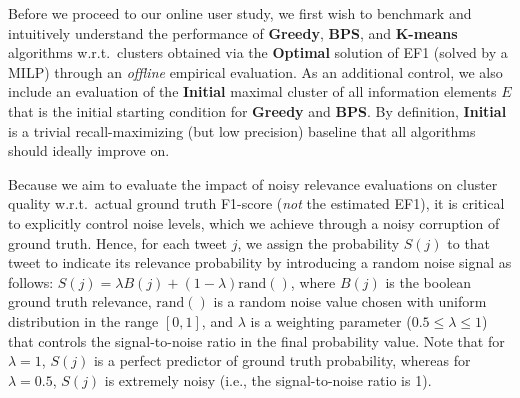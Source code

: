 


Before we proceed to our online user study, we first wish to benchmark and intuitively understand the performance of {\bf Greedy}, {\bf BPS}, and {\bf $\mathbf{K}$-means} algorithms w.r.t.\ clusters obtained via the {\bf Optimal} solution of EF1 (solved by a MILP) through an \emph{offline} empirical evaluation.  As an additional control, we also include an evaluation of the {\bf Initial} maximal cluster of all information elements $E$ that is the initial starting condition for {\bf Greedy} and {\bf BPS}.  By definition, {\bf Initial} is a trivial recall-maximizing (but low precision) baseline that all algorithms should ideally improve on.

Because we aim to evaluate the impact of noisy relevance evaluations on cluster quality w.r.t.\ actual ground truth F1-score (\emph{not} the estimated EF1), it is critical to explicitly control noise levels, which we achieve through a noisy corruption of ground truth.
Hence, for each tweet $j$, we assign the probability $S(j)$ to that tweet to indicate its relevance probability by introducing a random noise signal as follows: $S(j) = \lambda B(j)+(1-\lambda) \textrm{rand}()$, 
where $B(j)$ is the boolean ground truth relevance,  $\textrm{rand}()$ is a random noise value chosen with uniform distribution in the range $[0,1]$, and $\lambda$ is a weighting parameter ($0.5 \leq \lambda \leq 1$) that controls the signal-to-noise ratio in the final probability value.  Note that for $\lambda=1$, $S(j)$ is a perfect predictor of ground truth probability, whereas for $\lambda=0.5$, $S(j)$ is extremely noisy (i.e., the signal-to-noise ratio is 1).


